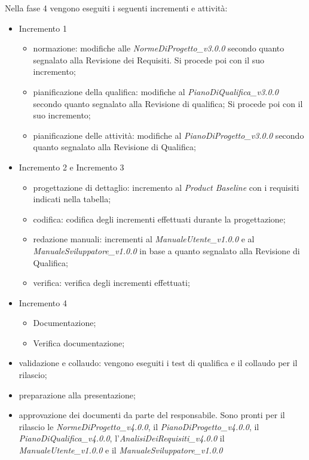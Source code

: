 Nella fase 4 vengono eseguiti i seguenti incrementi e attività:
\begin{itemize}
	\item Incremento 1
			\begin{itemize}
				\item normazione: modifiche alle \textit{NormeDiProgetto\_v3.0.0} secondo quanto segnalato alla Revisione dei Requisiti. Si procede poi con il suo incremento;
				\item pianificazione della qualifica: modifiche al \textit{PianoDiQualifica\_v3.0.0} secondo quanto segnalato alla Revisione di qualifica; Si procede poi con il suo incremento;
				\item pianificazione delle attività: modifiche al \textit{PianoDiProgetto\_v3.0.0} secondo quanto segnalato alla Revisione di Qualifica;
			\end{itemize}
	\item Incremento 2 e Incremento 3
		\begin{itemize}
			\item progettazione di dettaglio: incremento al \textit{Product Baseline} con i requisiti indicati nella tabella;
			\item codifica: codifica degli incrementi effettuati durante la progettazione;
			\item redazione manuali: incrementi al \textit{ManualeUtente\_v1.0.0} e al \textit{ManualeSviluppatore\_v1.0.0} in base a quanto segnalato alla Revisione di Qualifica;
			\item verifica: verifica degli incrementi effettuati;
		\end{itemize}
	\item Incremento 4
		\begin{itemize}
			\item Documentazione;
			\item Verifica documentazione;
		\end{itemize}
	\item validazione e collaudo: vengono eseguiti i test di qualifica e il collaudo per il rilascio;
	\item preparazione alla presentazione;
	\item approvazione dei documenti da parte del responsabile. Sono pronti per il rilascio le \textit{NormeDiProgetto\_v4.0.0}, il \textit{PianoDiProgetto\_v4.0.0}, il \textit{PianoDiQualifica\_v4.0.0}, l'\textit{AnalisiDeiRequisiti\_v4.0.0} il
	\textit{ManualeUtente\_v1.0.0} e il \textit{ManualeSviluppatore\_v1.0.0}
\end{itemize}


